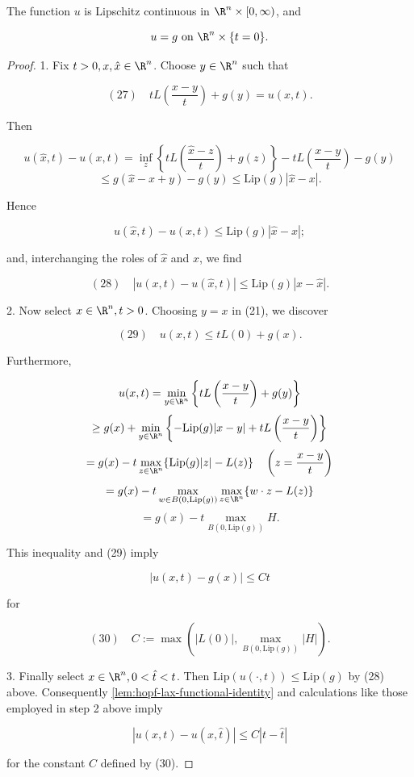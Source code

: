 \begin{lemma}
\label{lem:hopf-lax-lipschitz-continuity}
The function $u$ is Lipschitz continuous in $\R^n \times [0,\infty)$, and

$$u = g \text{ on } \R^n \times \{t=0\}.$$
\end{lemma}

\begin{proof}
1. Fix $t > 0, x, \hat{x} \in \R^n$. Choose $y \in \R^n$ such that

$$(27) \quad tL\left(\frac{x-y}{t}\right) + g(y) = u(x,t).$$

Then

$$u(\hat{x}, t) - u(x, t) = \inf_z \left\{tL\left(\frac{\hat{x} - z}{t}\right) + g(z)\right\} - tL\left(\frac{x-y}{t}\right) - g(y)$$
$$\leq g(\hat{x} - x + y) - g(y) \leq \text{Lip}(g)|\hat{x} - x|.$$

Hence

$$u(\hat{x},t) - u(x,t) \leq \text{Lip}(g)|\hat{x} - x|;$$

and, interchanging the roles of $\hat{x}$ and $x$, we find

$$(28) \quad |u(x,t) - u(\hat{x},t)| \leq \text{Lip}(g)|x - \hat{x}|.$$

2. Now select $x \in \R^n, t > 0$. Choosing $y = x$ in (21), we discover

$$(29) \quad u(x,t) \leq tL(0) + g(x).$$

Furthermore,

$$u(x,t) = \min_{y \in \R^n} \left\{tL\left(\frac{x-y}{t}\right) + g(y)\right\}$$
$$\geq g(x) + \min_{y \in \R^n} \left\{-\text{Lip}(g)|x - y| + tL\left(\frac{x-y}{t}\right)\right\}$$
$$= g(x) - t\max_{z \in \R^n} \{\text{Lip}(g)|z| - L(z)\} \quad \left(z = \frac{x-y}{t}\right)$$
$$= g(x) - t \max_{w \in B(0,\text{Lip}(g))} \max_{z \in \R^n} \{w \cdot z - L(z)\}$$
$$= g(x) - t \max_{B(0,\text{Lip}(g))} H.$$

This inequality and (29) imply

$$|u(x,t) - g(x)| \leq Ct$$

for

$$(30) \quad C := \max\left(|L(0)|, \max_{B(0,\text{Lip}(g))} |H|\right).$$

3. Finally select $x \in \R^n, 0 < \hat{t} < t$. Then $\text{Lip}(u(\cdot,t)) \leq \text{Lip}(g)$ by (28) above. Consequently \cref{lem:hopf-lax-functional-identity} and calculations like those employed in step 2 above imply

$$|u(x,t) - u(x,\hat{t})| \leq C|t - \hat{t}|$$

for the constant $C$ defined by (30).
\end{proof}

